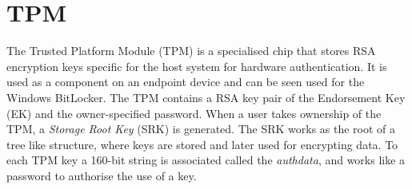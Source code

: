 \section{TPM} %
The Trusted Platform Module (TPM) is a specialised chip that stores RSA encryption keys specific for the host system for hardware authentication. It is used as a component on an endpoint device and can be seen used for the Windows BitLocker.
The TPM contains a RSA key pair of the Endorsement Key (EK) and the owner-specified password. When a user takes ownership of the TPM, a \textit{Storage Root Key} (SRK) is generated. The SRK works as the root of a tree like structure, where keys are stored and later used for encrypting data. To each TPM key a 160-bit string is associated called the \textit{authdata}, and works like a password to authorise the use of a key.

